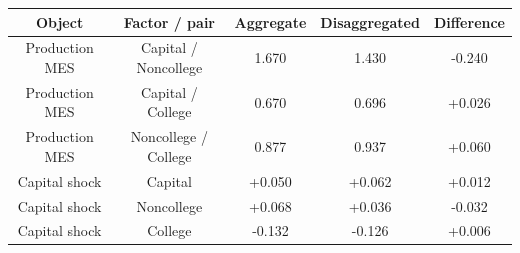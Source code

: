 \begin{table}[!ht]
\setlength\tabcolsep{0.425em}
\setlength\aboverulesep{0pt}
\setlength\belowrulesep{0.2em}
\centering
\begin{threeparttable}
\begin{tabular}{ccccc}
\toprule[0.1em]
Object & Factor / pair & Aggregate & Disaggregated & Difference \\[0.2em]
\midrule[0.075em]
Production MES & Capital / Noncollege & 1.670 & 1.430 & -0.240 \\[0.2em]
Production MES & Capital / College & 0.670 & 0.696 & +0.026 \\[0.2em]
Production MES & Noncollege / College & 0.877 & 0.937 & +0.060 \\[0.2em]
Capital shock & Capital & +0.050 & +0.062 & +0.012 \\[0.2em]
Capital shock & Noncollege & +0.068 & +0.036 & -0.032 \\[0.2em]
Capital shock & College & -0.132 & -0.126 & +0.006 \\[0.2em]
\bottomrule[0.1em]
\end{tabular}
\end{threeparttable}
\end{table}

